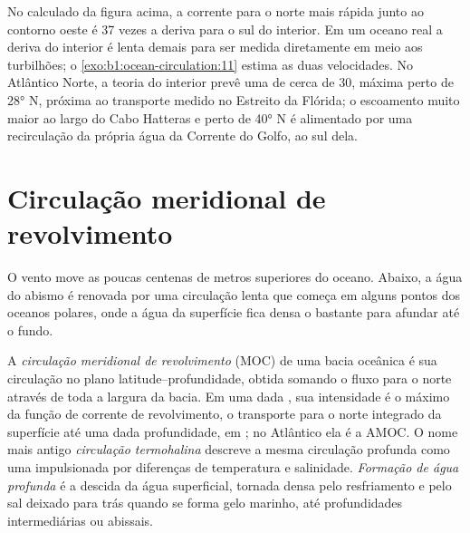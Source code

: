 No  calculado da figura acima, a corrente para o norte mais rápida junto ao
contorno oeste é 37 vezes a deriva para o sul do interior. Em um oceano real
a deriva do interior é lenta demais para ser medida diretamente em meio aos turbilhões;
o \cref{exo:b1:ocean-circulation:11} estima as duas velocidades.
No Atlântico Norte, a teoria do interior prevê uma 
de cerca de \qty{30}{\sverdrup}, máxima perto de \ang{28} N, próxima ao transporte
medido no Estreito da Flórida; o escoamento muito maior ao largo do Cabo Hatteras e perto de
\ang{40} N é alimentado por uma recirculação da própria água da Corrente do Golfo, ao sul dela.

\section{Circulação meridional de revolvimento}\label{sec:b1:ocean-circulation:moc}

O vento move as poucas centenas de metros superiores do oceano. Abaixo, a água do abismo é
renovada por uma circulação lenta que começa em alguns pontos dos oceanos polares,
onde a água da superfície fica densa o bastante para afundar até o fundo.

\begin{definition}\label{def:b1:ocean-circulation:moc}
A \emph{circulação meridional de revolvimento}
(MOC) de uma bacia oceânica é sua circulação no plano latitude--profundidade,
obtida somando o fluxo para o norte através de toda a largura da bacia. Em uma dada
, sua intensidade é o máximo da função de corrente de revolvimento, o
transporte para o norte integrado da superfície até uma dada profundidade, em
; no Atlântico ela é a AMOC. O nome mais antigo \emph{circulação
termohalina} descreve a mesma circulação profunda como
uma impulsionada por diferenças de temperatura e salinidade. \emph{Formação de
água profunda} é a descida da água superficial, tornada densa
pelo resfriamento e pelo sal deixado para trás quando se forma gelo marinho, até
profundidades intermediárias ou abissais.
\end{definition}

